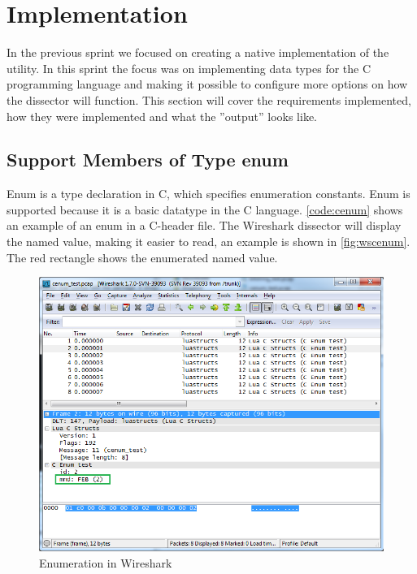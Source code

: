 \section{Implementation}

In the previous sprint we focused on creating a native implementation of the 
utility. In this sprint the focus was on implementing data types for the 
C programming language and making it possible to configure more options on how 
the dissector will function. This section will cover the requirements 
implemented, how they were implemented and what the ''output'' looks like.

\subsection{Support Members of Type enum}
\label{sec:supportenum}
Enum is a type declaration in C, which specifies enumeration constants.  Enum 
is supported because it is a basic datatype in the C language. 
\autoref{code:cenum} shows an example of an enum in a C-header file. The 
Wireshark dissector will display the named value, making it 
easier to read, an example is shown in \autoref{fig:wscenum}. The red 
rectangle shows the enumerated named value.

\begin{figure}[ht]
	\center
	\includegraphics[width=\textwidth]{./sprints/img/wireshark_cenum}
	\caption{Enumeration in Wireshark\label{fig:wscenum}}
\end{figure}

